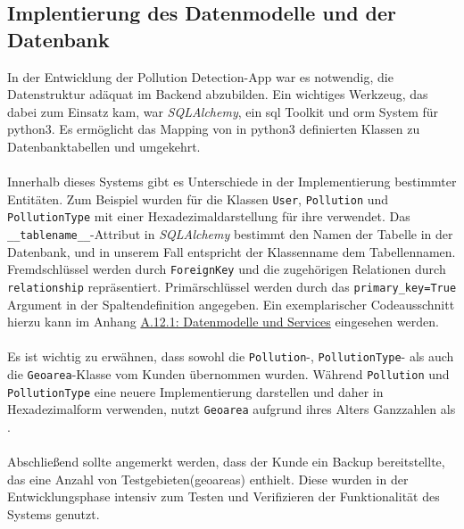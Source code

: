 \documentclass[a4paper,12pt]{article}
\begin{document}
\subsection{Implentierung des Datenmodelle und der Datenbank}
In der Entwicklung der \glqq Pollution Detection\grqq{}-App war es notwendig, die Datenstruktur adäquat im Backend abzubilden. Ein wichtiges Werkzeug, das dabei zum Einsatz kam, war \textit{SQLAlchemy}, ein \acrshort{sql} Toolkit und \gls{orm} System für \acrshort{python3}. Es ermöglicht das Mapping von in \acrshort{python3} definierten Klassen zu Datenbanktabellen und umgekehrt.\\
\\
Innerhalb dieses Systems gibt es Unterschiede in der Implementierung bestimmter Entitäten. Zum Beispiel wurden für die Klassen \texttt{User}, \texttt{Pollution} und \texttt{PollutionType}  mit einer Hexadezimaldarstellung für ihre  verwendet. Das \texttt{\_\_tablename\_\_}-Attribut in \textit{SQLAlchemy} bestimmt den Namen der Tabelle in der Datenbank, und in unserem Fall entspricht der Klassenname dem Tabellennamen. Fremdschlüssel werden durch \texttt{ForeignKey} und die zugehörigen Relationen durch \texttt{relationship} repräsentiert. Primärschlüssel werden durch das \texttt{primary\_key=True} Argument in der Spaltendefinition angegeben. Ein exemplarischer Codeausschnitt hierzu kann im Anhang \hyperref[lst:pollution]{A.12.1: Datenmodelle und Services} eingesehen werden.\\
\\
Es ist wichtig zu erwähnen, dass sowohl die \texttt{Pollution}-, \texttt{PollutionType}- als auch die \texttt{Geoarea}-Klasse vom Kunden übernommen wurden. Während \texttt{Pollution} und \texttt{Pollu\-tion\-Type}
 eine neuere Implementierung darstellen und daher  in Hexadezimalform verwenden, nutzt \texttt{Geoarea} aufgrund ihres Alters Ganzzahlen als .\\
\\
Abschließend sollte angemerkt werden, dass der Kunde ein Backup bereitstellte, das eine Anzahl von Testgebieten(\glspl{geoarea}) enthielt. Diese wurden in der Entwicklungsphase intensiv zum Testen und Verifizieren der Funktionalität des Systems genutzt.
\end{document}
